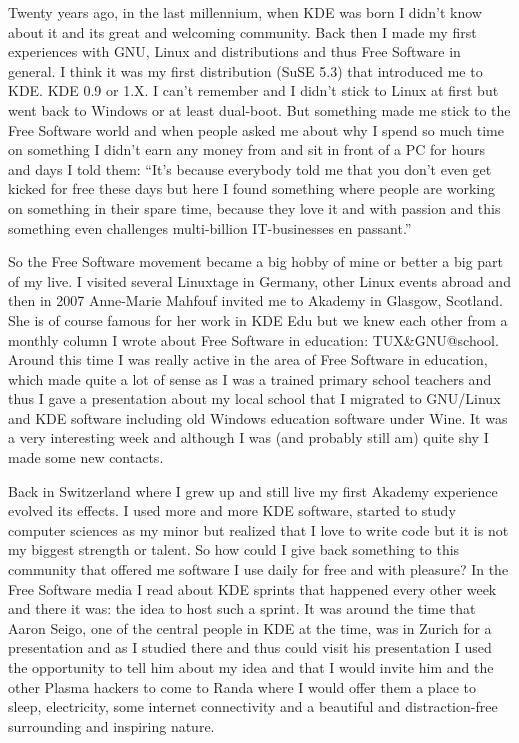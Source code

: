 


\noindent{}Twenty years ago, in the last millennium, when KDE was born I didn't know about it and its great and welcoming community. Back then I made my first experiences with GNU, Linux and distributions and thus Free Software in general. I think it was my first distribution (SuSE 5.3) that introduced me to KDE. KDE 0.9 or 1.X. I can't remember and I didn't stick to Linux at first but went back to Windows or at least dual-boot. But something made me stick to the Free Software world and when people asked me about why I spend so much time on something I didn't earn any money from and sit in front of a PC for hours and days I told them:
``It's because everybody told me that you don't even get kicked for free these days but here I found something where people are working on something in their spare time, because they love it and with passion and this something even challenges multi-billion IT-businesses en passant.''

So the Free Software movement became a big hobby of mine or better a big part of my live. I visited several Linuxtage in Germany, other Linux events abroad and then in 2007 Anne-Marie Mahfouf invited me to Akademy in Glasgow, Scotland. She is of course famous for her work in KDE Edu but we knew each other from a monthly column I wrote about Free Software in education: TUX\&GNU@school. Around this time I was really active in the area of Free Software in education, which made quite a lot of sense as I was a trained primary school teachers and thus I gave a presentation about my local school that I migrated to GNU/Linux and KDE software including old Windows education software under Wine. It was a very interesting week and although I was (and probably still am) quite shy I made some new contacts.

Back in Switzerland where I grew up and still live my first Akademy experience evolved its effects. I used more and more KDE software, started to study computer sciences as my minor but realized that I love to write code but it is not my biggest strength or talent. So how could I give back something to this community that offered me software I use daily for free and with pleasure? In the Free Software media I read about KDE sprints that happened every other week and there it was: the idea to host such a sprint. It was around the time that Aaron Seigo, one of the central people in KDE at the time, was in Zurich for a presentation and as I studied there and thus could visit his presentation I used the opportunity to tell him about my idea and that I would invite him and the other Plasma hackers to come to Randa where I would offer them a place to sleep, electricity, some internet connectivity and a beautiful and distraction-free surrounding and inspiring nature.

